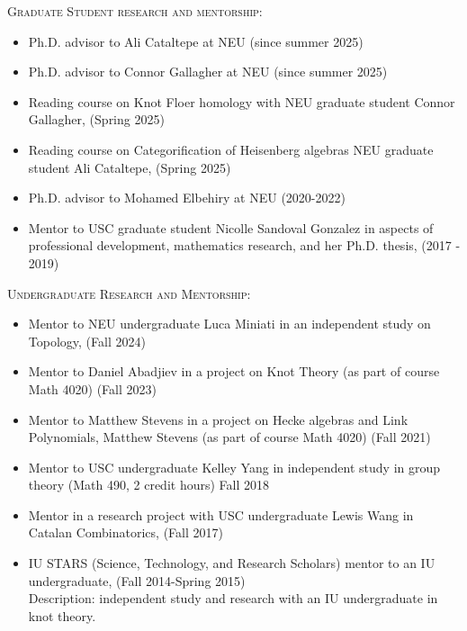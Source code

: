 \documentclass[12pt]{amsart}
\newcommand{\newitem}[1]{\noindent\textsc{#1:}\vskip5pt  }
\begin{document}
\begin{itemize}
\newitem{Graduate Student research and mentorship}

\begin{itemize}\setlength{\itemsep}{5pt}
\item[$\cdot$] Ph.D. advisor to Ali Cataltepe at NEU (since summer 2025)
\item[$\cdot$] Ph.D. advisor to Connor Gallagher at NEU (since summer 2025)
\item[$\cdot$] Reading course on Knot Floer homology with NEU graduate student Connor Gallagher, (Spring 2025) 

\item[$\cdot$] Reading course on Categorification of Heisenberg algebras NEU graduate student Ali Cataltepe,  (Spring 2025)

\item[$\cdot$] Ph.D. advisor to Mohamed Elbehiry at NEU  (2020-2022)

\item[$\cdot$] Mentor to USC graduate student Nicolle Sandoval Gonzalez in aspects of professional development, mathematics research, and her Ph.D. thesis, (2017 - 2019)
\end{itemize}

\newitem{Undergraduate Research and Mentorship}

\begin{itemize}\setlength{\itemsep}{5pt}
\item[$\cdot$] Mentor to NEU undergraduate Luca Miniati in an independent study on Topology, (Fall 2024)

\item[$\cdot$] Mentor to Daniel Abadjiev in a project on Knot Theory (as part of course Math 4020) (Fall 2023)

\item[$\cdot$] Mentor to Matthew Stevens in a project on Hecke algebras and Link Polynomials, Matthew Stevens (as part of course Math 4020) (Fall 2021)

\item[$\cdot$] Mentor to USC undergraduate Kelley Yang in independent study in group theory (Math 490, 2 credit hours) Fall 2018

\item[$\cdot$]Mentor in a research project with USC undergraduate Lewis Wang in Catalan Combinatorics, (Fall 2017)

\item[$\cdot$]IU STARS (Science, Technology, and Research Scholars) mentor to an IU undergraduate, (Fall 2014-Spring 2015)\\
Description: independent study and research with an IU undergraduate in knot theory.\


\end{itemize}
\end{itemize}
\end{document}
